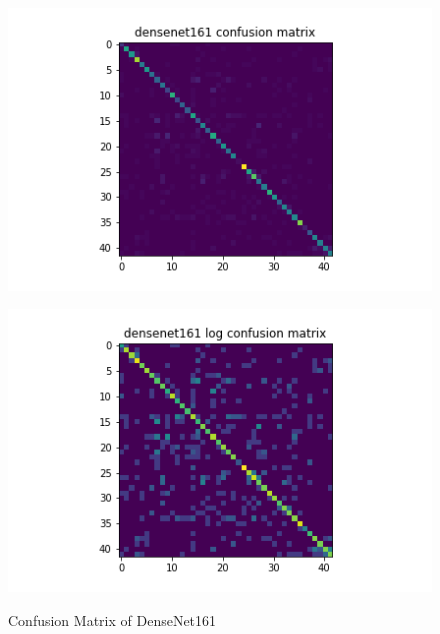 \begin{figure}[t]
\begin{minipage}[b]{.5\linewidth}
    {\includegraphics[width=1.2\textwidth]{figs/conf_matrix/densenet161_conf.png}}
  \end{minipage}
  \hfill
  \begin{minipage}[b]{.5\linewidth}
    \centering

    {\includegraphics[width=1.2\textwidth]{figs/conf_matrix/densenet161_log_conf.png}}
  \end{minipage}

  \caption{Confusion Matrix of DenseNet161}
  \label{fig:densenet161_conf}
  \vspace{0.2in}
\end{figure}

